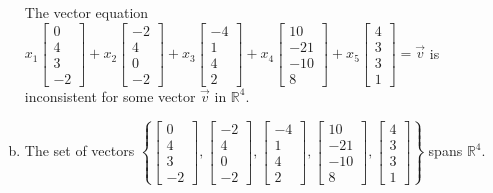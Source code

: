 \begin{exerciseAnswer}
\begin{enumerate}[(a)]
\begin{center}\begin{minipage}{0.8\textwidth}
 The vector equation \( x_{1} \left[\begin{array}{c}
0 \\
4 \\
3 \\
-2
\end{array}\right] + x_{2} \left[\begin{array}{c}
-2 \\
4 \\
0 \\
-2
\end{array}\right] + x_{3} \left[\begin{array}{c}
-4 \\
1 \\
4 \\
2
\end{array}\right] + x_{4} \left[\begin{array}{c}
10 \\
-21 \\
-10 \\
8
\end{array}\right] + x_{5} \left[\begin{array}{c}
4 \\
3 \\
3 \\
1
\end{array}\right] =\vec{v}\) is inconsistent for some vector \(\vec{v}\) in \(\mathbb{R}^4\). 
\end{minipage}\end{center}
    
\item  The set of vectors \( \left\{ \left[\begin{array}{c}
0 \\
4 \\
3 \\
-2
\end{array}\right] , \left[\begin{array}{c}
-2 \\
4 \\
0 \\
-2
\end{array}\right] , \left[\begin{array}{c}
-4 \\
1 \\
4 \\
2
\end{array}\right] , \left[\begin{array}{c}
10 \\
-21 \\
-10 \\
8
\end{array}\right] , \left[\begin{array}{c}
4 \\
3 \\
3 \\
1
\end{array}\right] \right\} \) spans \(\mathbb{R}^4\). 
\end{enumerate}
    
\end{exerciseAnswer}
    
